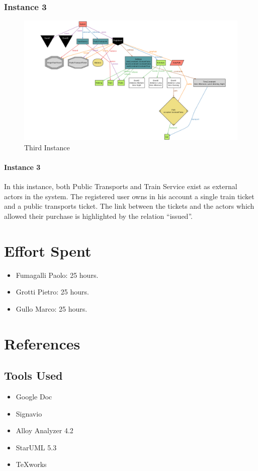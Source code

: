 \documentclass{article}
\begin{document}
\subsubsection{Instance 3}
\begin{figure}[H]
\includegraphics[width=\linewidth]{Instance_3.png}
\caption{Third Instance}
\label{fig:ALLOY3}
\end{figure}
\paragraph{Instance 3}
In this instance, both Public Transports and Train Service exist as external actors in the system. The registered user owns in his account a single train ticket and a public transports ticket. The link between the tickets and the actors which allowed their purchase is highlighted by the relation “issued”.
\section{Effort Spent}
\begin{itemize}
\item{Fumagalli Paolo:} 25 hours.
\item{Grotti Pietro:} 25 hours.
\item{Gullo Marco:} 25 hours.
\end{itemize}
\section{References}
\subsection{Tools Used}
\begin{itemize}
\item{} Google Doc
\item{} Signavio
\item{} Alloy Analyzer 4.2
\item{} StarUML 5.3
\item{} TeXworks
\end{itemize}
\end{document}

